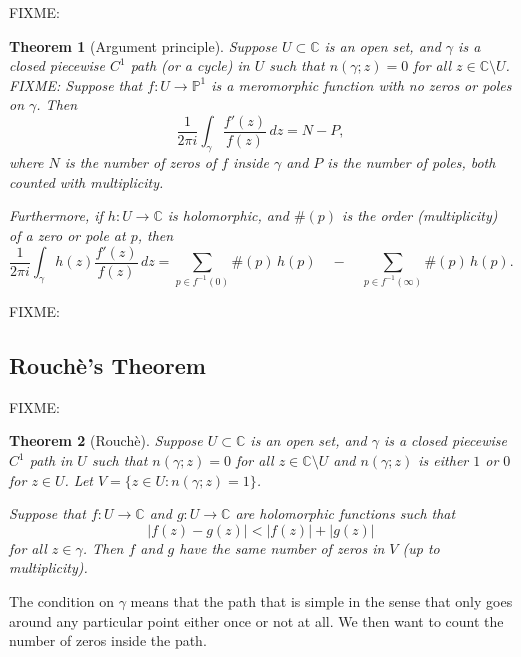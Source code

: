 \documentclass[12pt,openany]{book}
\newcommand{\sabs}[1]{\lvert {#1} \rvert}
\newcommand{\C}{{\mathbb{C}}}
\newcommand{\bP}{{\mathbb{P}}}
\theoremstyle{plain}
\newtheorem{thm}{Theorem}[section]
\theoremstyle{remark}
\theoremstyle{definition}
\theoremstyle{exercise}
\theoremstyle{example}
\begin{document}
FIXME:

\begin{thm}[Argument principle]\label{thm:argprinc}
Suppose $U \subset \C$ is an open set, and $\gamma$ is a closed piecewise $C^1$
path (or a cycle) in $U$ such that $n(\gamma;z) = 0$ for all $z \in \C
\setminus U$.
FIXME:
Suppose that $f \colon U \to \bP^1$ is a meromorphic function with no zeros
or poles on $\gamma$.
Then
\begin{equation*}
\frac{1}{2\pi i}
\int_\gamma \frac{f'(z)}{f(z)} \, dz
= N - P ,
\end{equation*}
where $N$ is the number of zeros of $f$ inside $\gamma$ and $P$ is the
number of poles, both counted with multiplicity.

Furthermore, if $h \colon U \to \C$ is holomorphic, and $\#(p)$ is the order
(multiplicity) of a zero or pole at $p$, then
\begin{equation*}
\frac{1}{2\pi i}
\int_\gamma h(z) \frac{f'(z)}{f(z)} \, dz
=
\sum_{p \in f^{-1}(0)}
\#(p) \, h(p)
\quad
-
\quad
\sum_{p \in f^{-1}(\infty)}
\#(p) \, h(p) .
\end{equation*}
\end{thm}

FIXME:

\subsection{Rouch\`e's Theorem}


FIXME:

\begin{thm}[Rouch\`e]\label{thm:rouche}
Suppose $U \subset \C$ is an open set, and $\gamma$ is a closed piecewise $C^1$
path in $U$ such that $n(\gamma;z) = 0$ for all $z \in \C \setminus U$
and $n(\gamma;z)$ is either $1$ or $0$ for $z \in U$.  Let $V = \{ z \in U
: n(\gamma;z) = 1 \}$.

Suppose that $f \colon U \to \C$ and $g \colon U \to \C$
are holomorphic functions such that
\begin{equation*}
\sabs{f(z)-g(z)} < \sabs{f(z)}+\sabs{g(z)}
\end{equation*}
for all $z \in \gamma$.  Then $f$ and $g$
have the same number of zeros in $V$
(up to multiplicity).
\end{thm}

The condition on $\gamma$ means that the
path that is simple in the sense
that only goes around any particular point either once or not at all.
We then want to count the number of zeros inside the path.
\end{document}
